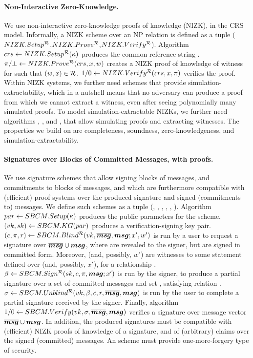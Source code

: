 \paragraph{Non-Interactive Zero-Knowledge.} %
We use non-interactive zero-knowledge proofs of knowledge (NIZK), in the CRS
model. Informally, a NIZK scheme over an NP relation \NIZKRel is defined as a
tuple ($NIZK.Setup^{\mathcal{R}}$,$NIZK.Prove^{\mathcal{R}}$,$NIZK.Verify^\mathcal{R}$).
Algorithm $crs \gets NIZK.Setup^{\mathcal{R}}(\kappa)$ produces the common
reference string \NIZKcrs. $\pi/\bot \gets NIZK.Prove^{\mathcal{R}}(crs,
x,w)$ creates a NIZK proof of knowledge of witness \NIZKw for \NIZKx
such that $(w,x) \in \mathcal{R}$. $1/0 \gets NIZK.Verify^{\mathcal{R}}
(crs,x,\pi)$ verifies the proof. Within NIZK systems, we
further need schemes that provide simulation-extractability, which in a nutshell
means that no adversary can produce a proof from which we cannot extract a
witness, even after seeing polynomially many simulated proofs. To model
simulation-extractable NIZKs, we further need algorithms \NIZKSimSetup,
\NIZKSim, and \NIZKExtract, that allow simulating proofs and extracting
witnesses. The properties we build on are completeness, soundness,
zero-knowledgeness, and simulation-extractability.

\paragraph{Signatures over Blocks of Committed Messages, with proofs.} %
We use signature schemes that allow signing blocks of messages, and commitments
to blocks of messages, and which are furthermore compatible with (efficient)
proof systems over the produced signature and signed (commitments to) messages.
We define such schemes as a tuple (\SBCMSetup, \SBCMKeyGen,
\SBCMBlind, \SBCMSign, \SBCMUnblind, \SBCMVerify).
%
Algorithm $par \gets SBCM.Setup(\kappa)$ produces the public parameters for
the scheme.
% 
$(vk,sk) \gets SBCM.KG(par)$ produces a verification-signing key pair.
%
$(c,\pi,r) \gets SBCM.Blind^{\mathcal{R}}(vk,\overline{\boldsymbol{msg}},\boldsymbol{msg};x',w')$ is run by a
user to request a signature over $\overline{\boldsymbol{msg}} \cup \boldsymbol{msg}$, where \smsg are revealed
to the signer, but \osmsg are signed in committed form.
Moreover, \osmsg (and, possibly, $w'$) are witnesses to some statement defined
over \smsg (and, possibly, $x'$), for a relationship \NIZKRel.
%
$\beta \gets SBCM.Sign^{\mathcal{R}}(sk,c,\pi,\boldsymbol{msg}; x')$ is run by the
signer, to produce a partial signature \bsig over a set of committed
messages \osmsg and set \smsg, satisfying relation \NIZKRel.
%
$\sigma \gets SBCM.Unblind^{\mathcal{R}}(vk,\beta,c,r,\overline{\boldsymbol{msg}},\boldsymbol{msg})$ is
run by the user to complete a partial signature \bsig received by the
signer.
%
Finally, algorithm $1/0 \gets SBCM.Verify(vk,\sigma,\overline{\boldsymbol{msg}},\boldsymbol{msg})$ verifies a
signature \sig over message vector $\overline{\boldsymbol{msg}} \cup \boldsymbol{msg}$.
%
In addition, the produced signatures must be compatible with (efficient) NIZK
proofs of knowledge of a signature, and of (arbitrary) claims over the signed
(committed) messages. An \SBCM scheme must provide one-more-forgery type of
security.

